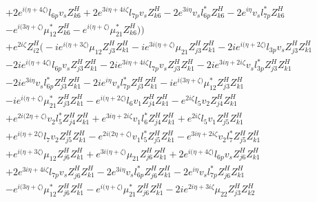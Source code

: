 \begin{align}
 &+2 e^{i \Big(\eta +4 \zeta \Big)} l_{6p} v_s Z_{{k 6}}^{H} +2 e^{3 i \eta +4 i \zeta } l_{7p} v_s Z_{{k 6}}^{H} -2 e^{3 i \eta } v_s l_{6p}^* Z_{{k 6}}^{H} -2 e^{i \eta } v_s l_{7p}^* Z_{{k 6}}^{H} \nonumber \\ 
 &- e^{i \Big(3 \eta +\zeta \Big)} \mu_{12}^* Z_{{k 6}}^{H} - e^{i \Big(\eta +\zeta \Big)} \mu_{21}^* Z_{{k 6}}^{H} \Big)\Big)\nonumber \\ 
 &+e^{2 i \zeta } Z_{{i 2}}^{H} \Big(-i e^{i \Big(\eta +3 \zeta \Big)} \mu_{12} Z_{{j 3}}^{H} Z_{{k 1}}^{H} -i e^{3 i \Big(\eta +\zeta \Big)} \mu_{21} Z_{{j 3}}^{H} Z_{{k 1}}^{H} -2 i e^{i \Big(\eta +2 \zeta \Big)} l_{3p} v_s Z_{{j 3}}^{H} Z_{{k 1}}^{H} \nonumber \\ 
 &-2 i e^{i \Big(\eta +4 \zeta \Big)} l_{6p} v_s Z_{{j 3}}^{H} Z_{{k 1}}^{H} -2 i e^{3 i \eta +4 i \zeta } l_{7p} v_s Z_{{j 3}}^{H} Z_{{k 1}}^{H} -2 i e^{3 i \eta +2 i \zeta } v_s l_{3p}^* Z_{{j 3}}^{H} Z_{{k 1}}^{H} \nonumber \\ 
 &-2 i e^{3 i \eta } v_s l_{6p}^* Z_{{j 3}}^{H} Z_{{k 1}}^{H} -2 i e^{i \eta } v_s l_{7p}^* Z_{{j 3}}^{H} Z_{{k 1}}^{H} -i e^{i \Big(3 \eta +\zeta \Big)} \mu_{12}^* Z_{{j 3}}^{H} Z_{{k 1}}^{H} \nonumber \\ 
 &-i e^{i \Big(\eta +\zeta \Big)} \mu_{21}^* Z_{{j 3}}^{H} Z_{{k 1}}^{H} - e^{i \Big(\eta +2 \zeta \Big)} l_6 v_1 Z_{{j 4}}^{H} Z_{{k 1}}^{H} - e^{2 i \zeta } l_5 v_2 Z_{{j 4}}^{H} Z_{{k 1}}^{H} \nonumber \\ 
 &+e^{2 i \Big(2 \eta +\zeta \Big)} v_2 l_5^* Z_{{j 4}}^{H} Z_{{k 1}}^{H} +e^{3 i \eta +2 i \zeta } v_1 l_6^* Z_{{j 4}}^{H} Z_{{k 1}}^{H} +e^{2 i \zeta } l_5 v_1 Z_{{j 5}}^{H} Z_{{k 1}}^{H} \nonumber \\ 
 &+e^{i \Big(\eta +2 \zeta \Big)} l_7 v_2 Z_{{j 5}}^{H} Z_{{k 1}}^{H} - e^{2 i \Big(2 \eta +\zeta \Big)} v_1 l_5^* Z_{{j 5}}^{H} Z_{{k 1}}^{H} - e^{3 i \eta +2 i \zeta } v_2 l_7^* Z_{{j 5}}^{H} Z_{{k 1}}^{H} \nonumber \\ 
 &+e^{i \Big(\eta +3 \zeta \Big)} \mu_{12} Z_{{j 6}}^{H} Z_{{k 1}}^{H} +e^{3 i \Big(\eta +\zeta \Big)} \mu_{21} Z_{{j 6}}^{H} Z_{{k 1}}^{H} +2 e^{i \Big(\eta +4 \zeta \Big)} l_{6p} v_s Z_{{j 6}}^{H} Z_{{k 1}}^{H} \nonumber \\ 
 &+2 e^{3 i \eta +4 i \zeta } l_{7p} v_s Z_{{j 6}}^{H} Z_{{k 1}}^{H} -2 e^{3 i \eta } v_s l_{6p}^* Z_{{j 6}}^{H} Z_{{k 1}}^{H} -2 e^{i \eta } v_s l_{7p}^* Z_{{j 6}}^{H} Z_{{k 1}}^{H} \nonumber \\ 
 &- e^{i \Big(3 \eta +\zeta \Big)} \mu_{12}^* Z_{{j 6}}^{H} Z_{{k 1}}^{H} - e^{i \Big(\eta +\zeta \Big)} \mu_{21}^* Z_{{j 6}}^{H} Z_{{k 1}}^{H} -2 i e^{2 i \eta +3 i \zeta } \mu_{22} Z_{{j 3}}^{H} Z_{{k 2}}^{H} \nonumber \\ 

\end{align}
